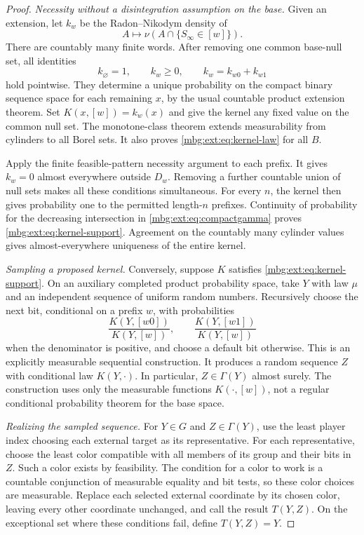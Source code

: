 \documentclass[11pt,letterpaper]{article}
\theoremstyle{definition}
\begin{document}
\begin{proof}
\emph{Necessity without a disintegration assumption on the base.}
Given an extension, let $k_w$ be the Radon--Nikodym density of
\[
A\longmapsto\nu(A\cap\{S_\infty\in[w]\}).
\]
There are countably many finite words. After removing one common base-null set, all identities
\[
k_{\varnothing}=1,\qquad k_w\ge0,\qquad
k_w=k_{w0}+k_{w1}
\]
hold pointwise. They determine a unique probability on the compact binary sequence space for each remaining $x$, by the usual countable product extension theorem. Set $K(x,[w])=k_w(x)$ and give the kernel any fixed value on the common null set. The monotone-class theorem extends measurability from cylinders to all Borel sets. It also proves \eqref{mbg:ext:eq:kernel-law} for all $B$.

Apply the finite feasible-pattern necessity argument to each prefix. It gives $k_w=0$ almost everywhere outside $D_w$. Removing a further countable union of null sets makes all these conditions simultaneous. For every $n$, the kernel then gives probability one to the permitted length-$n$ prefixes. Continuity of probability for the decreasing intersection in \eqref{mbg:ext:eq:compactgamma} proves \eqref{mbg:ext:eq:kernel-support}. Agreement on the countably many cylinder values gives almost-everywhere uniqueness of the entire kernel.

\emph{Sampling a proposed kernel.}
Conversely, suppose $K$ satisfies \eqref{mbg:ext:eq:kernel-support}. On an auxiliary completed product probability space, take $Y$ with law $\mu$ and an independent sequence of uniform random numbers. Recursively choose the next bit, conditional on a prefix $w$, with probabilities
\[
\frac{K(Y,[w0])}{K(Y,[w])},\qquad
\frac{K(Y,[w1])}{K(Y,[w])}
\]
when the denominator is positive, and choose a default bit otherwise. This is an explicitly measurable sequential construction. It produces a random sequence $Z$ with conditional law $K(Y,\cdot)$. In particular, $Z\in\Gamma(Y)$ almost surely. The construction uses only the measurable functions $K(\cdot,[w])$, not a regular conditional probability theorem for the base space.

\emph{Realizing the sampled sequence.}
For $Y\in G$ and $Z\in\Gamma(Y)$, use the least player index choosing each external target as its representative. For each representative, choose the least color compatible with all members of its group and their bits in $Z$. Such a color exists by feasibility. The condition for a color to work is a countable conjunction of measurable equality and bit tests, so these color choices are measurable. Replace each selected external coordinate by its chosen color, leaving every other coordinate unchanged, and call the result $T(Y,Z)$. On the exceptional set where these conditions fail, define $T(Y,Z)=Y$.


\end{proof}
\end{document}
